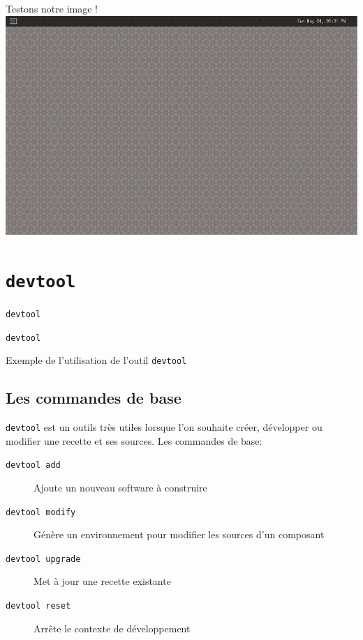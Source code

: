 \documentclass[compress]{smilebeamer}
\begin{document}
\begin{frame}
\begin{center}
\huge{Testons notre image !}
\includegraphics[width=1\textwidth]{images/weston-desktop.png}
\end{center}
\end{frame}


\section{\texttt{devtool}}

\begin{frame}{\texttt{devtool}}
\end{frame}

\begin{frame}{\texttt{devtool}}
\begin{center}
\textcolor{smileOrange}{\huge{Exemple de l'utilisation de l'outil \texttt{devtool}}}
\end{center}
\end{frame}

\subsection{Les commandes de base}

\begin{frame}
\texttt{devtool} est un outils très utiles lorsque l'on souhaite créer, développer ou modifier une recette et ses sources.\newline
\newline
Les commandes de base:
\begin{description}
	\item[\texttt{devtool add}] Ajoute un nouveau software à construire
	\item[\texttt{devtool modify}] Génère un environnement pour modifier les sources d'un composant
	\item[\texttt{devtool upgrade}] Met à jour une recette existante
	\item[\texttt{devtool reset}] Arrête le contexte de développement
\end{description}
\end{frame}
\end{document}
